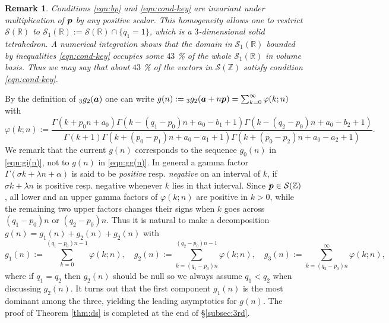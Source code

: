 \documentclass[a4paper,12pt]{article}
\theoremstyle{plain}
\newtheorem{remark}[theorem]{Remark}
\def\R{\mathbb{R}}
\def\Z{\mathbb{Z}}
\def\cS{\mathcal{S}}
\def\vG{\varGamma}
\def\ba{\mbox{\boldmath $a$}}
\def\bp{\mbox{\boldmath $p$}}
\begin{document}
\begin{remark} \label{rem:ds} 
Conditions \eqref{eqn:bp} and \eqref{eqn:cond-key} are 
invariant under multiplication of $\bp$ by any positive scalar. 
This homogeneity allows one to restrict $\cS(\R)$ to 
$\cS_1(\R) := \cS(\R) \cap \{ q_1 = 1\}$, which is a $3$-dimensional 
solid tetrahedron.  
A numerical integration shows that the domain in $\cS_1(\R)$ 
bounded by inequalities \eqref{eqn:cond-key} occupies some $43$ \% 
of the whole $\cS_1(\R)$ in volume basis.  
Thus we may say that about $43$ \% of the vectors in $\cS(\Z)$ 
satisfy condition \eqref{eqn:cond-key}. 
\end{remark}
\par
By the definition of ${}_3g_2(\ba)$ one can write $g(n) := 
{}_3g_2(\ba + n \bp) = \sum_{k=0}^{\infty} \varphi(k; n)$ with   
\[
\varphi(k; n) :=   
\frac{\vG(k + p_0 n + a_0) \vG(k-(q_1-p_0) n+a_0-b_1+1) 
\vG(k-(q_2-p_0) n+a_0-b_2+1)}{\vG(k+1) \vG(k+(p_0-p_1) n+a_0-a_1+1) 
\vG(k+(p_0-p_2) n+ a_0-a_2+1)}.  
\]
We remark that the current $g(n)$ corresponds to the sequence 
$g_0(n)$ in \eqref{eqn:gi(n)}, not to $g(n)$ in \eqref{eqn:gg(n)}. 
In general a gamma factor $\vG(\sigma k + \lambda n + \alpha)$ is said 
to be {\sl positive} resp. {\sl negative} on an interval of $k$, if 
$\sigma k + \lambda n$ is positive resp. negative whenever 
$k$ lies in that interval.   
Since $\bp \in \cS(\Z)$, all lower and an upper gamma factors of 
$\varphi(k; n)$ are positive in $k > 0$, while the remaining two upper 
factors changes their signs when $k$ goes across $(q_1-p_0) n$ or 
$(q_2-p_0) n$.    
Thus it is natural to make a decomposition $g(n) = g_1(n) + g_2(n) + g_2(n)$ 
with  
\[
g_1(n) := \sum_{k=0}^{(q_1-p_0) n-1} \varphi(k; n), 
\quad 
g_2(n) :=\sum_{k=(q_1-p_0) n}^{(q_2-p_0) n-1} \varphi(k; n), 
\quad 
g_3(n) :=\sum_{k=(q_2-p_0) n}^{\infty} \varphi(k; n),    
\]
where if $q_1 = q_2$ then $g_2(n)$ should be null so 
we always assume $q_1 < q_2$ when discussing $g_2(n)$. 
It turns out that the first component $g_1(n)$ is 
the most dominant among the three, yielding the leading 
asymptotics for $g(n)$.   
The proof of Theorem \ref{thm:ds} is completed at the end 
of \S\ref{subsec:3rd}.   
\end{document}
